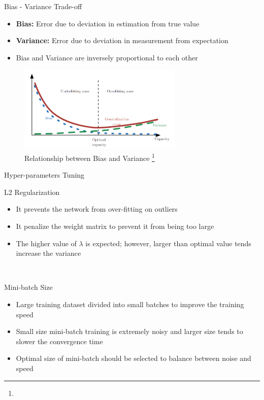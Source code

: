 \documentclass[10pt]{beamer}
\begin{document}
\begin{frame}{Bias - Variance Trade-off}
   \begin{itemize}
       \item \textbf{Bias:} Error due to deviation in estimation from true value
       \item \textbf{Variance:} Error due to deviation in measurement from expectation
       \item Bias and Variance are inversely proportional to each other 
   \end{itemize}
   
   \begin{figure}
        \centering
        \includegraphics[width=0.7\textwidth]{Images/relationship.png}
        \caption{Relationship between Bias and Variance \footnote{}}
    \end{figure}
\end{frame}

\begin{frame}{Hyper-parameters Tuning}
\begin{block}{L2 Regularization}
    \begin{itemize}
        \item It prevents the network from over-fitting on outliers 
        \item It penalize the weight matrix to prevent it from being too large
        \item The higher value of $\lambda$ is expected; however, larger than optimal value tends increase the variance  
    \end{itemize}
    \\
\end{block}   

    \begin{block}{Mini-batch Size}
        \begin{itemize}
            \item Large training dataset divided into small batches to improve the training speed
            \item Small size mini-batch training is extremely noisy and larger size tends to slower the convergence time
            \item Optimal size of mini-batch should be selected to balance between noise and speed
        \end{itemize}
    \end{block}

\end{frame}
\end{document}

